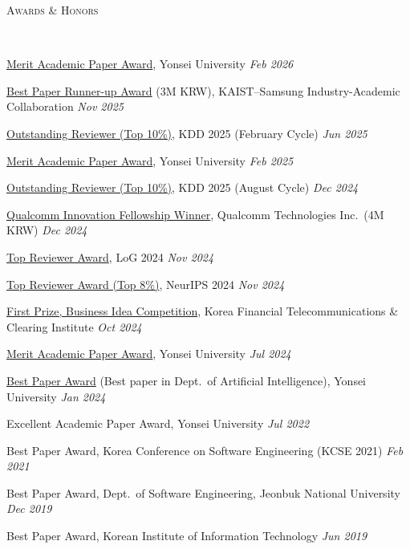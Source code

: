 \documentclass[10pt]{article}
\newenvironment{changemargin}[2]{
  \begin{list}{}{
    \setlength{\topsep}{0pt}
    \setlength{\leftmargin}{#1}
    \setlength{\rightmargin}{#2}
    \setlength{\listparindent}{\parindent}
    \setlength{\itemindent}{\parindent}
    \setlength{\parsep}{\parskip}
  }
  \item[]}{\end{list}
}
\newcommand{\lineover}{
	\begin{changemargin}{-0.05in}{-0.05in}
		\vspace*{-8pt}
		\hrulefill \\
		\vspace*{-2pt}
	\end{changemargin}
}
\newcommand{\header}[1]{
	\begin{changemargin}{-0.5in}{-0.5in}
		\scshape{#1}\\
  	\lineover
	\end{changemargin}
}
\newcommand{\award}[2]{
	{#1} \hfill \emph{#2}\\ \medskip
}
\newenvironment{body} {
	\vspace*{-16pt}
	\begin{changemargin}{-0.25in}{-0.5in}
  }
	{\end{changemargin}
}
\begin{document}
\medskip
\pagebreak
\header{Awards \& Honors}
\begin{body}
	\vspace{14pt}
\award{\href{https://graduate.yonsei.ac.kr/graduate/board/news.do?mode=view&articleNo=464785}{Merit Academic Paper Award}, Yonsei University}{Feb 2026}
\award{\href{https://www.jeongwhanchoi.com/assets/award/KAIST-SAMSUNG-BESTPAPER-RUNNERUP.pdf}{Best Paper Runner-up Award} (3M KRW), KAIST--Samsung Industry-Academic Collaboration}{Nov 2025}
\award{\href{https://kdd2025.kdd.org/research-track-program-committee/\#february_cycle}{Outstanding Reviewer (Top 10\%)}, KDD 2025 (February Cycle)}{Jun 2025}
\award{\href{https://graduate.yonsei.ac.kr/graduate/board/news.do?mode=view&articleNo=220032}{Merit Academic Paper Award}, Yonsei University}{Feb 2025}
\award{\href{https://kdd2025.kdd.org/research-track-program-committee/\#august_cycle}{Outstanding Reviewer (Top 10\%)}, KDD 2025 (August Cycle)}{Dec 2024}
\award{\href{https://www.qualcomm.com/research/university-relations/innovation-fellowship/2024-south-korea}{Qualcomm Innovation Fellowship Winner}, Qualcomm Technologies Inc.\ (4M KRW)}{Dec 2024}
\award{\href{https://x.com/LogConference/status/1862602407395697123}{Top Reviewer Award}, LoG 2024}{Nov 2024}
\award{\href{https://neurips.cc/Conferences/2024/ProgramCommittee\#top-reviewers}{Top Reviewer Award (Top 8\%)}, NeurIPS 2024}{Nov 2024}
\award{\href{https://drive.google.com/file/d/1--cUGRX6rB9rc2phbMeIJ7BdHRNCj_au/view?usp=sharing}{First Prize, Business Idea Competition}, Korea Financial Telecommunications \& Clearing Institute}{Oct 2024}
\award{\href{https://graduate.yonsei.ac.kr/graduate/board/news.do?mode=view&articleNo=208151}{Merit Academic Paper Award}, Yonsei University}{Jul 2024}
\award{\href{https://graduate.yonsei.ac.kr/graduate/board/news.do?mode=view&articleNo=181558}{Best Paper Award} (Best paper in Dept.\ of Artificial Intelligence), Yonsei University}{Jan 2024}
\award{Excellent Academic Paper Award, Yonsei University}{Jul 2022}
\award{Best Paper Award, Korea Conference on Software Engineering (KCSE 2021)}{Feb 2021}
\award{Best Paper Award, Dept.\ of Software Engineering, Jeonbuk National University}{Dec 2019}
\award{Best Paper Award, Korean Institute of Information Technology}{Jun 2019}
\end{body}
 
\medskip
 
\end{document}

